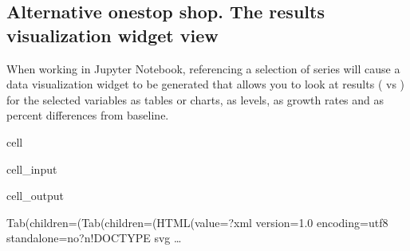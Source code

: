 \documentclass[letterpaper,10pt,english]{jupyterBook}
\begin{document}
\subsection{Alternative one\sphinxhyphen{}stop shop. The results visualization widget view}
\label{\detokenize{content/05_WBModels/ScenarioAnalysis:alternative-one-stop-shop-the-results-visualization-widget-view}}
\sphinxAtStartPar
When working in Jupyter Notebook, referencing a selection of series will cause a data visualization widget to be generated that allows you to look at results ( vs ) for the selected variables as tables or charts, as levels, as growth rates and as percent differences from baseline.

\begin{sphinxuseclass}{cell}\begin{sphinxVerbatimInput}

\begin{sphinxuseclass}{cell_input}
\begin{sphinxVerbatim}[commandchars=\\\{\}]
\PYG{p}{[}\PYG{p}{]}
\end{sphinxVerbatim}

\end{sphinxuseclass}\end{sphinxVerbatimInput}
\begin{sphinxVerbatimOutput}

\begin{sphinxuseclass}{cell_output}
\begin{sphinxVerbatim}[commandchars=\\\{\}]
Tab(children=(Tab(children=(HTML(value=\PYGZsq{}\PYGZlt{}?xml version=\PYGZdq{}1.0\PYGZdq{} encoding=\PYGZdq{}utf\PYGZhy{}8\PYGZdq{} standalone=\PYGZdq{}no\PYGZdq{}?\PYGZgt{}\PYGZbs{}n\PYGZlt{}!DOCTYPE svg …
\end{sphinxVerbatim}

\begin{sphinxVerbatim}[commandchars=\\\{\}]

\end{sphinxVerbatim}

\end{sphinxuseclass}\end{sphinxVerbatimOutput}

\end{sphinxuseclass}
\sphinxstepscope
\end{document}
